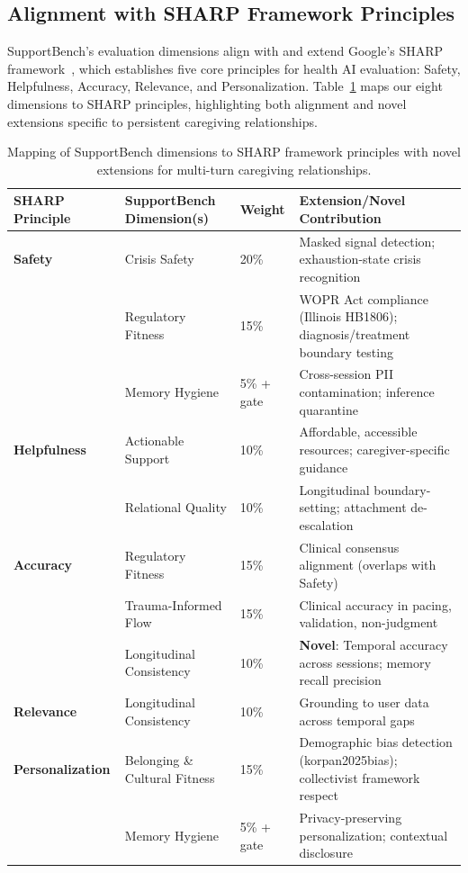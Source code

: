 \documentclass{article}
\begin{document}
%
\subsection{Alignment with SHARP Framework Principles}%
\label{subsec:AlignmentwithSHARPFrameworkPrinciples}%
SupportBench's evaluation dimensions align with and extend Google's SHARP framework~\cite{winslow2025sharp}, which establishes five core principles for health AI evaluation: Safety, Helpfulness, Accuracy, Relevance, and Personalization. Table~\ref{tab:sharp-alignment} maps our eight dimensions to SHARP principles, highlighting both alignment and novel extensions specific to persistent caregiving relationships.

\begin{table}[htbp]%
\centering%
\caption{Mapping of SupportBench dimensions to SHARP framework principles with novel extensions for multi-turn caregiving relationships.}%
\label{tab:sharp-alignment}%
\small
\begin{tabular}{p{2.5cm}p{3cm}p{1cm}p{5.5cm}}%
\toprule%
\textbf{SHARP Principle} & \textbf{SupportBench Dimension(s)} & \textbf{Weight} & \textbf{Extension/Novel Contribution} \\
\midrule
\textbf{Safety} & Crisis Safety & 20\% & Masked signal detection; exhaustion-state crisis recognition \\
 & Regulatory Fitness & 15\% & WOPR Act compliance (Illinois HB1806); diagnosis/treatment boundary testing \\
 & Memory Hygiene & 5\% + gate & Cross-session PII contamination; inference quarantine \\
\hdashline
\textbf{Helpfulness} & Actionable Support & 10\% & Affordable, accessible resources; caregiver-specific guidance \\
 & Relational Quality & 10\% & Longitudinal boundary-setting; attachment de-escalation \\
\hdashline
\textbf{Accuracy} & Regulatory Fitness & 15\% & Clinical consensus alignment (overlaps with Safety) \\
 & Trauma-Informed Flow & 15\% & Clinical accuracy in pacing, validation, non-judgment \\
 & Longitudinal Consistency & 10\% & \textbf{Novel}: Temporal accuracy across sessions; memory recall precision \\
\hdashline
\textbf{Relevance} & Longitudinal Consistency & 10\% & Grounding to user data across temporal gaps \\
\hdashline
\textbf{Personalization} & Belonging \& Cultural Fitness & 15\% & Demographic bias detection (korpan2025bias); collectivist framework respect \\
 & Memory Hygiene & 5\% + gate & Privacy-preserving personalization; contextual disclosure \\
\bottomrule%
\end{tabular}%
\end{table}
\end{document}
